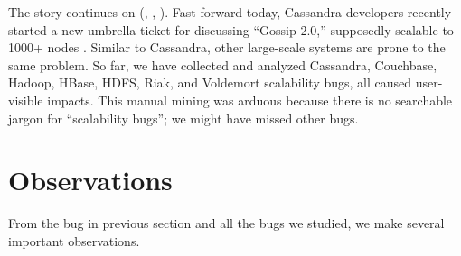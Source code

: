 %
%

The story continues on (, , \etc).  Fast forward today,
Cassandra developers recently started a new umbrella ticket for discussing
``Gossip 2.0,''  supposedly scalable to 1000+
nodes \cite{Gossip20, Gossip20Mail}.
Similar to Cassandra, other large-scale systems are prone to the same
problem.  So far, we have collected and analyzed \totCass Cassandra, \totCouch
Couchbase, \totHadoop Hadoop, \totHBase HBase, \totHDFS HDFS, \totRiak
Riak, and \totVold Voldemort scalability bugs, all caused user-visible
impacts.
%
This manual mining was arduous because there is no searchable jargon for
``scalability bugs''; we might have missed other bugs.
%

\section{Observations}
\label{mot-observe}

From the bug in previous section and all the bugs we studied, we make several
important observations.

